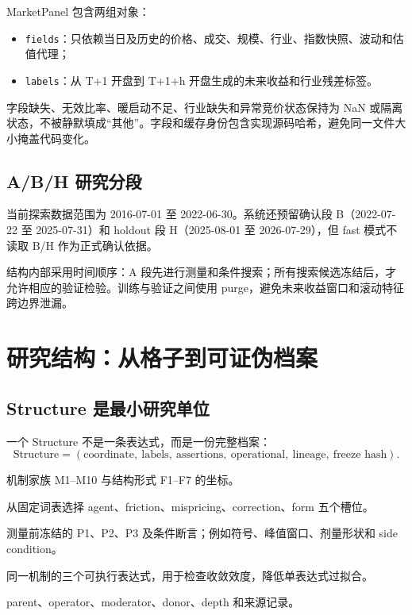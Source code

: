 \documentclass[11pt,a4paper]{article}
\newcommand{\code}[1]{\texttt{#1}}
\begin{document}
MarketPanel 包含两组对象：
\begin{itemize}[leftmargin=2em]
  \item \code{fields}：只依赖当日及历史的价格、成交、规模、行业、指数快照、波动和估值代理；
  \item \code{labels}：从 T+1 开盘到 T+1+h 开盘生成的未来收益和行业残差标签。
\end{itemize}

字段缺失、无效比率、暖启动不足、行业缺失和异常竞价状态保持为 NaN 或隔离状态，不被静默填成“其他”。字段和缓存身份包含实现源码哈希，避免同一文件大小掩盖代码变化。

\subsection{A/B/H 研究分段}
当前探索数据范围为 2016-07-01 至 2022-06-30。系统还预留确认段 B（2022-07-22 至 2025-07-31）和 holdout 段 H（2025-08-01 至 2026-07-29），但 fast 模式不读取 B/H 作为正式确认依据。

结构内部采用时间顺序：A 段先进行测量和条件搜索；所有搜索候选冻结后，才允许相应的验证检验。训练与验证之间使用 purge，避免未来收益窗口和滚动特征跨边界泄漏。

\section{研究结构：从格子到可证伪档案}
\subsection{Structure 是最小研究单位}
一个 Structure 不是一条表达式，而是一份完整档案：
\begin{equation}
\text{Structure} = (\text{coordinate},\ \text{labels},\ \text{assertions},\ \text{operational},\ \text{lineage},\ \text{freeze hash}).
\end{equation}

\begin{description}[leftmargin=2em]
  \item[coordinate] 机制家族 M1--M10 与结构形式 F1--F7 的坐标。
  \item[labels] 从固定词表选择 agent、friction、mispricing、correction、form 五个槽位。
  \item[assertions] 测量前冻结的 P1、P2、P3 及条件断言；例如符号、峰值窗口、剂量形状和 side condition。
  \item[operational] 同一机制的三个可执行表达式，用于检查收敛效度，降低单表达式过拟合。
  \item[lineage] parent、operator、moderator、donor、depth 和来源记录。
\end{description}
\end{document}
